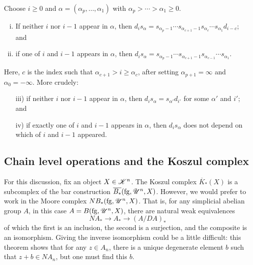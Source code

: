 \documentclass[11pt]{article}
\newcommand{\LL}[1]{{\scrK}^{#1}}%
\newcommand{\nontop}[1]{\scrU^{#1}}%
\newcommand{\forget}{\mathrm{fg}}
\begin{document}
\begin{LieLambdaStructureOnKoszul}
\begin{lem*}
Choose $i\geq0$ and $\alpha=(\alpha_p,\ldots,\alpha_1)$ with $\alpha_p>\cdots >\alpha_1\geq0$.
\begin{enumerate}[i)]\squishlist
\setlength{\parindent}{.25in}
\item If neither $i$ nor $i-1$ appear in $\alpha$, then  $d_is_\alpha=s_{\alpha_p-1}\cdots s_{\alpha_{c+1}-1}s_{\alpha_c}\cdots s_{\alpha_1}d_{i-c}$; and
\item if one of $i$ and $i-1$ appears in $\alpha$, then  $d_is_\alpha=s_{\alpha_p-1}\cdots s_{\alpha_{c+1}-1}s_{\alpha_{c-1}}\cdots s_{\alpha_1}$.
\end{enumerate}
Here, $c$ is the index such that $\alpha_{c+1}>i\geq\alpha_{c}$, after setting  $\alpha_{p+1}=\infty$ and $\alpha_0=-\infty$. More crudely:
\begin{enumerate}[i)]\squishlist
\setlength{\parindent}{.25in}
\item[iii)] if neither $i$ nor $i-1$ appear in $\alpha$, then  $d_is_\alpha=s_{\alpha'}d_{i'}$ for some $\alpha'$ and $i'$; and
\item[iv)] if exactly one of $i$ and $i-1$ appears in $\alpha$, then  $d_is_\alpha$ does not depend on which of $i$ and $i-1$ appeared.
\end{enumerate}
\end{lem*}
\subsection{Chain level operations and the Koszul complex}

For this discussion, fix an object $X\in\LL{n}$.
The Koszul complex $\overline{K}_*(X)$ is a subcomplex of the bar construction $\overline{B_*}(\forget,\nontop{n},X)$. However, we would prefer to work in the Moore complex $N{B_*}(\forget,\nontop{n},X)$. That is, for any simplicial abelian group $A$, in this case $A=B(\forget,\nontop{n},X)$, there are natural weak equivalences
\[NA_*\to A_*\to (A/DA)_*\]
of which the first is an inclusion, the second is a surjection, and the composite is an isomorphism. Giving the inverse isomorphism could be a little difficult: this theorem shows that for any $z\in A_n$, there is a unique degenerate element $b$ such that $z+b\in NA_n$, but one must find this $b$.


\end{LieLambdaStructureOnKoszul}
\end{document}
